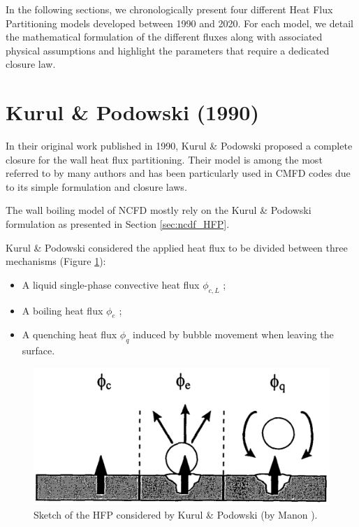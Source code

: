 \npar

In the following sections, we chronologically present four different Heat Flux Partitioning models developed between 1990 and 2020. For each model, we detail the mathematical formulation of the different fluxes along with associated physical assumptions and highlight the parameters that require a dedicated closure law.


\section{Kurul \& Podowski (1990)}
\label{sec:hfp_kurul}


In their original work published in 1990, Kurul \& Podowski \cite{kurul_1990} proposed a complete closure for the wall heat flux partitioning. Their model is among the most referred to by many authors and has been particularly used in CMFD codes due to its simple formulation and closure laws.

\begin{note*}{}
The wall boiling model of NCFD mostly rely on the Kurul \& Podowski formulation as presented in Section \ref{sec:ncdf_HFP}.
\end{note*}


Kurul \& Podowski considered the applied heat flux to be divided between three mechanisms (Figure \ref{fig:KP_hfp}):

\begin{itemize}
\item A liquid single-phase convective heat flux $\phi_{c,L}$ ;
\item A boiling heat flux $\phi_{e}$ ;
\item A quenching heat flux $\phi_{q}$ induced by bubble movement when leaving the surface.
\end{itemize}

\begin{figure}[!h]
\centering
\includegraphics[width=0.6\linewidth]{img/HFP/KP/KP_hfp.PNG}
\caption{Sketch of the HFP considered by Kurul \& Podowski (by Manon \cite{manon_contribution_2000}).}
\label{fig:KP_hfp}
\end{figure}

